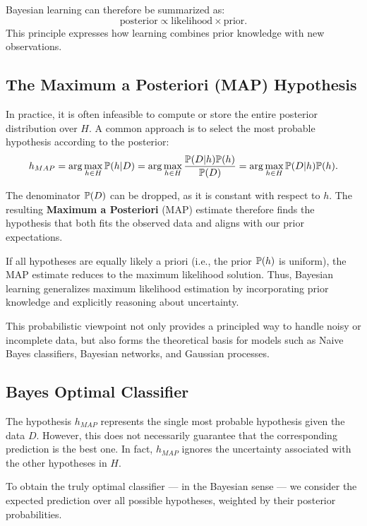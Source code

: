 \documentclass[10pt, letterpaper]{report}
\begin{document}
\noindent
Bayesian learning can therefore be summarized as:
\[
	\text{posterior} \propto \text{likelihood} \times \text{prior}.
\]
This principle expresses how learning combines prior knowledge with new observations.

\bigskip
\subsection{The Maximum a Posteriori (MAP) Hypothesis}

In practice, it is often infeasible to compute or store the entire posterior distribution over $H$.
A common approach is to select the most probable hypothesis according to the posterior:
\begin{equation}
	h_{MAP} = \arg\max_{h \in H} {\mathbb P}(h | D)
	= \arg\max_{h \in H} \frac{{\mathbb P}(D | h){\mathbb P}(h)}{{\mathbb P}(D)}
	= \arg\max_{h \in H} {\mathbb P}(D | h){\mathbb P}(h).
\end{equation}

\noindent
The denominator ${\mathbb P}(D)$ can be dropped, as it is constant with respect to $h$.
The resulting \textbf{Maximum a Posteriori} (MAP) estimate therefore finds the hypothesis that both fits the observed data and aligns with our prior expectations.

\bigskip
If all hypotheses are equally likely a priori (i.e., the prior ${\mathbb P}(h)$ is uniform), the MAP estimate reduces to the maximum likelihood solution.
Thus, Bayesian learning generalizes maximum likelihood estimation by incorporating prior knowledge and explicitly reasoning about uncertainty.

\bigskip
This probabilistic viewpoint not only provides a principled way to handle noisy or incomplete data, but also forms the theoretical basis for models such as Naive Bayes classifiers, Bayesian networks, and Gaussian processes.

\subsection{Bayes Optimal Classifier}

The hypothesis $h_{MAP}$ represents the single most probable hypothesis given the data $D$.
However, this does not necessarily guarantee that the corresponding prediction is the best one.
In fact, $h_{MAP}$ ignores the uncertainty associated with the other hypotheses in $H$.

To obtain the truly optimal classifier — in the Bayesian sense — we consider the expected prediction over all possible hypotheses, weighted by their posterior probabilities.
\end{document}
